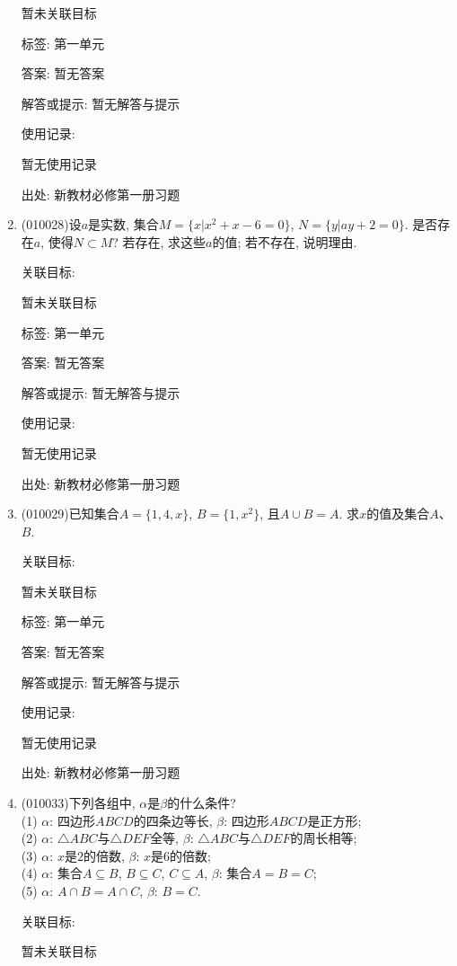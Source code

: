 \documentclass[10pt,a4paper]{article}
\begin{document}
\begin{enumerate}[1.]
暂未关联目标



标签: 第一单元

答案: 暂无答案

解答或提示: 暂无解答与提示

使用记录:

暂无使用记录


出处: 新教材必修第一册习题
\item { (010028)}设$a$是实数, 集合$M=\{x|x^2+x-6=0\}$, $N=\{y|ay+2=0\}$. 是否存在$a$, 使得$N\subset M$? 若存在, 求这些$a$的值; 若不存在, 说明理由.


关联目标:

暂未关联目标



标签: 第一单元

答案: 暂无答案

解答或提示: 暂无解答与提示

使用记录:

暂无使用记录


出处: 新教材必修第一册习题
\item { (010029)}已知集合$A=\{1, 4, x\}$, $B=\{1, x^2\}$, 且$A\cup B=A$. 求$x$的值及集合$A$、$B$.


关联目标:

暂未关联目标



标签: 第一单元

答案: 暂无答案

解答或提示: 暂无解答与提示

使用记录:

暂无使用记录


出处: 新教材必修第一册习题
\item { (010033)}下列各组中, $\alpha$是$\beta$的什么条件?\\
(1) $\alpha$: 四边形$ABCD$的四条边等长, $\beta$: 四边形$ABCD$是正方形;\\
(2) $\alpha$: $\triangle ABC$与$\triangle DEF$全等, $\beta$: $\triangle ABC$与$\triangle DEF$的周长相等;\\
(3) $\alpha$: $x$是$2$的倍数, $\beta$: $x$是$6$的倍数;\\
(4) $\alpha$: 集合$A\subseteq B$, $B\subseteq C$, $C\subseteq A$, $\beta$: 集合$A=B=C$;\\
(5) $\alpha$: $A\cap B=A\cap C$, $\beta$: $B=C$.


关联目标:

暂未关联目标




\end{enumerate}
\end{document}
